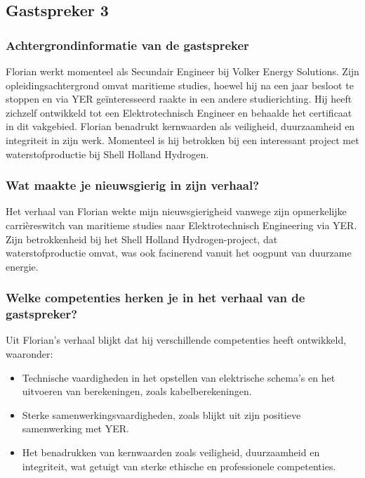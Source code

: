 \subsection{Gastspreker 3}
\subsubsection{Achtergrondinformatie van de gastspreker}
Florian werkt momenteel als Secundair Engineer bij Volker Energy Solutions. Zijn opleidingsachtergrond omvat maritieme studies, hoewel hij na een jaar besloot te stoppen en via YER geïnteresseerd raakte in een andere studierichting. Hij heeft zichzelf ontwikkeld tot een Elektrotechnisch Engineer en behaalde het certificaat in dit vakgebied. Florian benadrukt kernwaarden als veiligheid, duurzaamheid en integriteit in zijn werk. Momenteel is hij betrokken bij een interessant project met waterstofproductie bij Shell Holland Hydrogen.

\subsubsection{Wat maakte je nieuwsgierig in zijn verhaal?}
Het verhaal van Florian wekte mijn nieuwsgierigheid vanwege zijn opmerkelijke carrièreswitch van maritieme studies naar Elektrotechnisch Engineering via YER. Zijn betrokkenheid bij het Shell Holland Hydrogen-project, dat waterstofproductie omvat, was ook facinerend vanuit het oogpunt van duurzame energie.

\subsubsection{Welke competenties herken je in het verhaal van de gastspreker?}
Uit Florian's verhaal blijkt dat hij verschillende competenties heeft ontwikkeld, waaronder:
\begin{itemize}
    \item Technische vaardigheden in het opstellen van elektrische schema's en het uitvoeren van berekeningen, zoals kabelberekeningen.
    \item Sterke samenwerkingsvaardigheden, zoals blijkt uit zijn positieve samenwerking met YER.
    \item Het benadrukken van kernwaarden zoals veiligheid, duurzaamheid en integriteit, wat getuigt van sterke ethische en professionele competenties.
\end{itemize}

